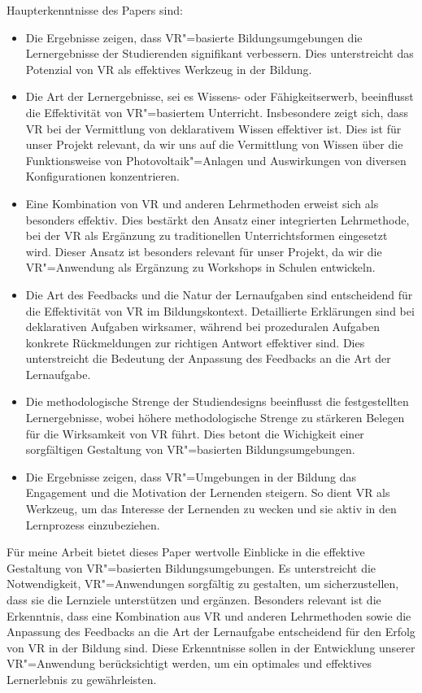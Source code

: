 \documentclass[draft]{vutinfth} %
\begin{document}
Haupterkenntnisse des Papers sind:
\begin{itemize}
  \item Die Ergebnisse zeigen, dass VR"=basierte Bildungsumgebungen die Lernergebnisse der Studierenden signifikant verbessern. Dies unterstreicht das Potenzial von VR als effektives Werkzeug in der Bildung.

  \item Die Art der Lernergebnisse, sei es Wissens- oder Fähigkeitserwerb, beeinflusst die Effektivität von VR"=basiertem Unterricht. Insbesondere zeigt sich, dass VR bei der Vermittlung von deklarativem Wissen effektiver ist. Dies ist für unser Projekt relevant, da wir uns auf die Vermittlung von Wissen über die Funktionsweise von Photovoltaik"=Anlagen und Auswirkungen von diversen Konfigurationen konzentrieren.

  \item Eine Kombination von VR und anderen Lehrmethoden erweist sich als besonders effektiv. Dies bestärkt den Ansatz einer integrierten Lehrmethode, bei der VR als Ergänzung zu traditionellen Unterrichtsformen eingesetzt wird. Dieser Ansatz ist besonders relevant für unser Projekt, da wir die VR"=Anwendung als Ergänzung zu Workshops in Schulen entwickeln.

  \item Die Art des Feedbacks und die Natur der Lernaufgaben sind entscheidend für die Effektivität von VR im Bildungskontext. Detaillierte Erklärungen sind bei deklarativen Aufgaben wirksamer, während bei prozeduralen Aufgaben konkrete Rückmeldungen zur richtigen Antwort effektiver sind. Dies unterstreicht die Bedeutung der Anpassung des Feedbacks an die Art der Lernaufgabe.

  \item Die methodologische Strenge der Studiendesigns beeinflusst die festgestellten Lernergebnisse, wobei höhere methodologische Strenge zu stärkeren Belegen für die Wirksamkeit von VR führt. Dies betont die Wichigkeit einer sorgfältigen Gestaltung von VR"=basierten Bildungsumgebungen.

  \item Die Ergebnisse zeigen, dass VR"=Umgebungen in der Bildung das Engagement und die Motivation der Lernenden steigern. So dient VR als Werkzeug, um das Interesse der Lernenden zu wecken und sie aktiv in den Lernprozess einzubeziehen.
\end{itemize}

Für meine Arbeit bietet dieses Paper wertvolle Einblicke in die effektive Gestaltung von VR"=basierten Bildungsumgebungen. Es unterstreicht die Notwendigkeit, VR"=Anwendungen sorgfältig zu gestalten, um sicherzustellen, dass sie die Lernziele unterstützen und ergänzen. Besonders relevant ist die Erkenntnis, dass eine Kombination aus VR und anderen Lehrmethoden sowie die Anpassung des Feedbacks an die Art der Lernaufgabe entscheidend für den Erfolg von VR in der Bildung sind. Diese Erkenntnisse sollen in der Entwicklung unserer VR"=Anwendung berücksichtigt werden, um ein optimales und effektives Lernerlebnis zu gewährleisten.
\end{document}
